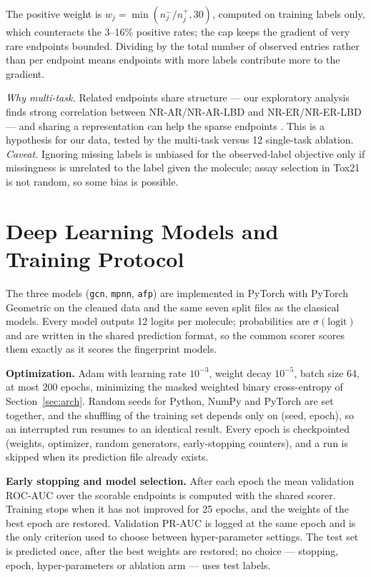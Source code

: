 \documentclass[conference]{IEEEtran}
\newcommand{\code}[1]{\texttt{\small #1}}
\begin{document}
The positive weight is $w_j=\min(n^-_j/n^+_j,30)$, computed on training labels only, which
counteracts the 3--16\% positive rates; the cap keeps the gradient of very rare endpoints
bounded. Dividing by the total number of observed entries rather than per endpoint means
endpoints with more labels contribute more to the gradient.

\emph{Why multi-task.} Related endpoints share structure --- our exploratory analysis finds
strong correlation between NR-AR/NR-AR-LBD and NR-ER/NR-ER-LBD --- and sharing a representation
can help the sparse endpoints \citep{caruana1997multitask,mayr2016deeptox}. This is a hypothesis
for our data, tested by the multi-task versus 12 single-task ablation.
\emph{Caveat.} Ignoring missing labels is unbiased for the observed-label objective only if
missingness is unrelated to the label given the molecule; assay selection in Tox21 is not random,
so some bias is possible.

\section{Deep Learning Models and Training Protocol}
\label{sec:dl}
The three models (\code{gcn}, \code{mpnn}, \code{afp}) are implemented in PyTorch with PyTorch
Geometric \citep{fey2019pyg} on the cleaned data and the same seven split files as the classical
models. Every model outputs 12 logits per molecule; probabilities are $\sigma(\text{logit})$ and
are written in the shared prediction format, so the common scorer scores them exactly as it
scores the fingerprint models.

\textbf{Optimization.} Adam \citep{kingma2015adam} with learning rate $10^{-3}$, weight decay
$10^{-5}$, batch size 64, at most 200 epochs, minimizing the masked weighted binary
cross-entropy of Section~\ref{sec:arch}. Random seeds for Python, NumPy and PyTorch are set
together, and the shuffling of the training set depends only on (seed, epoch), so an interrupted
run resumes to an identical result. Every epoch is checkpointed (weights, optimizer, random
generators, early-stopping counters), and a run is skipped when its prediction file already
exists.

\textbf{Early stopping and model selection.} After each epoch the mean validation ROC-AUC over
the scorable endpoints is computed with the shared scorer. Training stops when it has not
improved for 25 epochs, and the weights of the best epoch are restored. Validation PR-AUC is
logged at the same epoch and is the only criterion used to choose between hyper-parameter
settings. The test set is predicted once, after the best weights are restored; no choice ---
stopping, epoch, hyper-parameters or ablation arm --- uses test labels.
\end{document}
